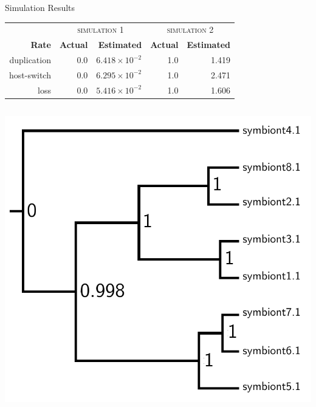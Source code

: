 \documentclass{beamer}
\begin{document}
\begin{frame}{Simulation Results}


\centering

\begin{tabular}{r | r r | r r}
\multicolumn{1}{c}{} & \multicolumn{2}{c}{\textsc{simulation 1}} & \multicolumn{2}{c}{\textsc{simulation 2}} \\
\textbf{Rate} & \textbf{Actual} & \textbf{Estimated} & \textbf{Actual} & \textbf{Estimated} \\
\hline
duplication & 0.0 & $6.418 \times 10^{-2}$ & 1.0 & 1.419 \\
host-switch & 0.0 & $6.295 \times 10^{-2}$ & 1.0 & 2.471 \\
loss & 0.0 & $5.416 \times 10^{-2}$ & 1.0 & 1.606\\
\end{tabular}

\pause

\begin{columns}

\begin{column}{0.5\textwidth}
\includegraphics[width=\textwidth]{figures/sim1.pdf}
\end{column}


\end{columns}
\end{frame}
\end{document}
